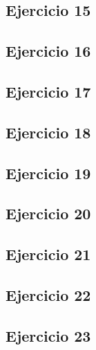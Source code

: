 \subsection{Ejercicio 15}
\subsection{Ejercicio 16}
\subsection{Ejercicio 17}
\subsection{Ejercicio 18}
\subsection{Ejercicio 19}
\subsection{Ejercicio 20}
\subsection{Ejercicio 21}
\subsection{Ejercicio 22}
\subsection{Ejercicio 23}
